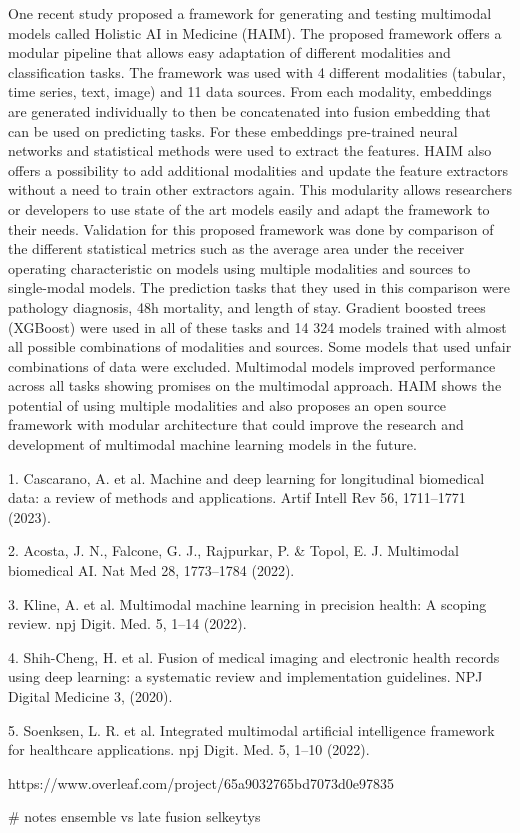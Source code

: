 One recent study proposed a framework for generating and testing multimodal models called Holistic AI in Medicine (HAIM). The proposed framework offers a modular pipeline that allows easy adaptation of different modalities and classification tasks. The framework was used with 4 different modalities (tabular, time series, text, image) and 11 data sources. From each modality, embeddings are generated individually to then be concatenated into fusion embedding that can be used on predicting tasks. For these embeddings pre-trained neural networks and statistical methods were used to extract the features.  HAIM also offers a possibility to add additional modalities and update the feature extractors without a need to train other extractors again. This modularity allows researchers or developers to use state of the art models easily and adapt the framework to their needs.
Validation for this proposed framework was done by comparison of the different statistical metrics such as the average area under the receiver operating characteristic on models using multiple modalities and sources to single-modal models. The prediction tasks that they used in this comparison were pathology diagnosis, 48h mortality, and length of stay. Gradient boosted trees (XGBoost) were used in all of these tasks and 14 324 models trained with almost all possible combinations of modalities and sources. Some models that used unfair combinations of data were excluded. Multimodal models improved performance across all tasks showing promises on the multimodal approach. HAIM shows the potential of using multiple modalities and also proposes an open source framework with modular architecture that could improve the research and development of multimodal machine learning models in the future. 


1. Cascarano, A. et al. Machine and deep learning for longitudinal biomedical data: a review of methods and applications. Artif Intell Rev 56, 1711–1771 (2023).

2. Acosta, J. N., Falcone, G. J., Rajpurkar, P. & Topol, E. J. Multimodal biomedical AI. Nat Med 28, 1773–1784 (2022).

3. Kline, A. et al. Multimodal machine learning in precision health: A scoping review. npj Digit. Med. 5, 1–14 (2022).

4. Shih-Cheng, H. et al. Fusion of medical imaging and electronic health records using deep learning: a systematic review and implementation guidelines. NPJ Digital Medicine 3, (2020).

5. Soenksen, L. R. et al. Integrated multimodal artificial intelligence framework for healthcare applications. npj Digit. Med. 5, 1–10 (2022).

https://www.overleaf.com/project/65a9032765bd7073d0e97835



# notes
ensemble vs late fusion selkeytys
